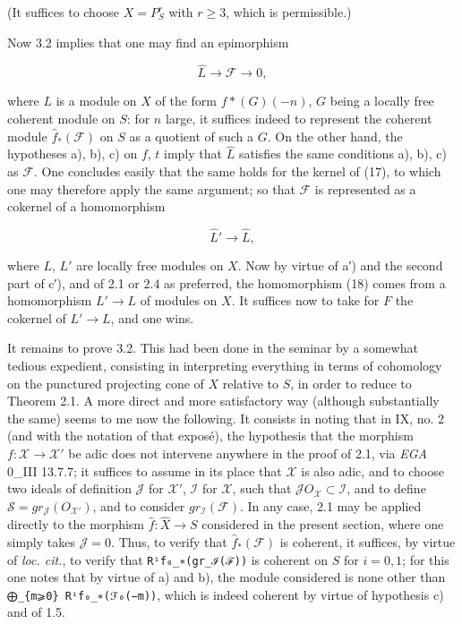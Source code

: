 \documentclass[
]{article}
\begin{document}
(It suffices to choose \(X = P^{r}_{S}\) with \(r \geqslant 3\), which
is permissible.)

Now 3.2 implies that one may find an epimorphism

\[
\hat{L} \to \mathcal{F} \to 0,
\]

where \(L\) is a module on \(X\) of the form \(f*(G)(-n)\), \(G\) being
a locally free coherent module on \(S\): for \(n\) large, it suffices
indeed to represent the coherent module \(\hat{f}_{\ast}(\mathcal{F})\)
on \(S\) as a quotient of such a \(G\). On the other hand, the
hypotheses a), b), c) on \(f\), \(t\) imply that \(\hat{L}\) satisfies
the same conditions a), b), c) as \(\mathcal{F}\). One concludes easily
that the same holds for the kernel of (17), to which one may therefore
apply the same argument; so that \(\mathcal{F}\) is represented as a
cokernel of a homomorphism

\[
\hat{L}' \to \hat{L},
\]

where \(L\), \(L'\) are locally free modules on \(X\). Now by virtue of
a′) and the second part of c′), and of 2.1 or 2.4 as preferred, the
homomorphism (18) comes from a homomorphism \(L' \to L\) of modules on
\(X\). It suffices now to take for \(F\) the cokernel of \(L' \to L\),
and one wins.

It remains to prove 3.2. This had been done in the seminar by a somewhat
tedious expedient, consisting in interpreting everything in terms of
cohomology on the punctured projecting cone of \(X\) relative to \(S\),
in order to reduce to Theorem 2.1. A more direct and more satisfactory
way (although substantially the same) seems to me now the following. It
consists in noting that in IX, no. 2 (and with the notation of that
exposé), the hypothesis that the morphism
\(f: \mathcal{X} \to \mathcal{X}'\) be adic does not intervene anywhere
in the proof of 2.1, via \emph{EGA} 0\_III 13.7.7; it suffices to assume
in its place that \(\mathcal{X}\) is also adic, and to choose two ideals
of definition \(\mathcal{J}\) for \(\mathcal{X}'\), \(\mathcal{I}\) for
\(\mathcal{X}\), such that
\(\mathcal{J} O_{\mathcal{X}} \subset \mathcal{I}\), and to define
\(\mathcal{S} = gr_{\mathcal{J}}(O_{\mathcal{X}'})\), and to consider
\(gr_{\mathcal{I}}(\mathcal{F})\). In any case, 2.1 may be applied
directly to the morphism \(\hat{f}: \hat{X} \to S\) considered in the
present section, where one simply takes \(\mathcal{J} = 0\). Thus, to
verify that \(\hat{f}_{\ast}(\mathcal{F})\) is coherent, it suffices, by
virtue of \emph{loc. cit.}, to verify that \texttt{Rⁱf₀\_∗(gr\_ℐ(ℱ))} is
coherent on \(S\) for \(i = 0, 1\); for this one notes that by virtue of
a) and b), the module considered is none other than
\texttt{⨁\_\{m⩾0\}\ Rⁱf₀\_∗(ℱ₀(−m))}, which is indeed coherent by virtue
of hypothesis c) and of 1.5.
\end{document}
